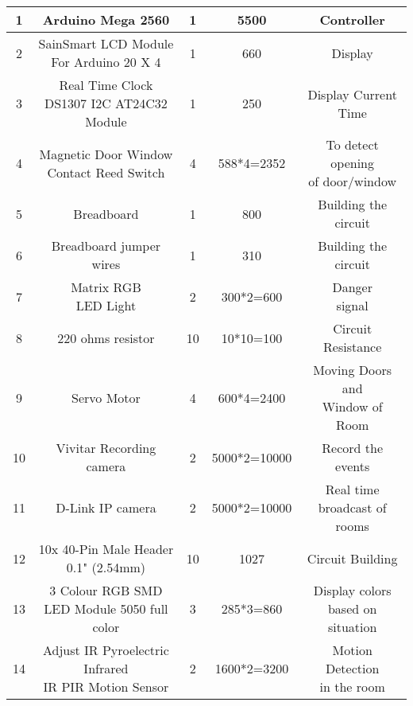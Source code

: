 \documentclass[margin, centered]{res}
\begin{document}
\begin{resume}
\begin{table}[ht]
\begin{tabular}{|c |c |c |c |c|}
1 & Arduino Mega 2560 & 1 & 5500 & Controller\\ \hline
2 & \makecell{SainSmart LCD Module \\ For Arduino 20 X 4} & 1 & 660 & Display\\ \hline
3 & \makecell{Real Time Clock \\ DS1307 I2C AT24C32 Module} & 1 & 250 & Display Current Time\\ \hline
4 & \makecell{Magnetic Door Window \\ Contact Reed Switch} & 4 & 588*4=2352 & \makecell{To detect opening \\of door/window} \\ \hline
5 & Breadboard & 1 & 800 & \makecell{Building the \\circuit}\\ \hline
6 & Breadboard jumper wires & 1 & 310 & \makecell{Building the \\circuit}\\ \hline
7 & \makecell{Matrix RGB \\LED Light} & 2 & 300*2=600 & \makecell{Danger\\signal}\\ \hline
8 & 220 ohms resistor & 10 & 10*10=100 & \makecell{Circuit \\Resistance}\\ \hline
9 & Servo Motor & 4 & 600*4=2400 & \makecell{Moving Doors and \\Window of Room}\\ \hline
10 & Vivitar Recording camera & 2 & 5000*2=10000 & Record the events\\ \hline
11 & D-Link IP camera & 2 & 5000*2=10000 & \makecell{Real time \\broadcast of rooms}\\ \hline
12 & 10x 40-Pin Male Header 0.1" (2.54mm) & 10 & 1027 & Circuit Building \\ \hline
13 & \makecell{3 Colour RGB SMD \\LED Module 5050 full color} & 3 & 285*3=860 & \makecell{Display colors \\based on situation}\\ \hline
14 & \makecell{Adjust IR Pyroelectric Infrared \\IR PIR Motion Sensor} & 2 & 1600*2=3200 & \makecell{Motion Detection \\in the room}\\ \hline

\end{tabular}
\end{table}
\end{resume}
\end{document}
